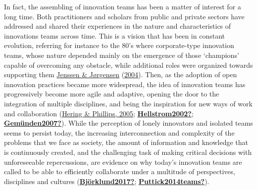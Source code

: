 \documentclass[]{elsarticle} %
\begin{document}
In fact, the assembling of innovation teams has been a matter of
interest for a long time. Both practitioners and scholars from public
and private sectors have addressed and shared their experiences in the
nature and characteristics of innovations teams across time. This is a
vision that has been in constant evolution, referring for instance to
the 80's where corporate-type innovation teams, whose nature depended
mainly on the emergence of those `champions' capable of overcoming any
obstacle, while additional roles were organized towards supporting them
\protect\hyperlink{ref-Jenssen2004}{Jenssen \& Jørgensen}
(\protect\hyperlink{ref-Jenssen2004}{2004}). Then, as the adoption of
open innovation practices became more widespread, the idea of innovation
teams has progressively become more agile and adaptive, opening the door
to the integration of multiple disciplines, and being the inspiration
for new ways of work and collaboration
(\protect\hyperlink{ref-Hering2005}{Hering \& Phillips, 2005};
\protect\hyperlink{ref-Hellstrom2002}{\textbf{Hellstrom2002?}};
\protect\hyperlink{ref-Gemuxfcnden2007}{\textbf{Gemünden2007?}}). While
the perception of lonely innovators and isolated teams seems to persist
today, the increasing interconnection and complexity of the problems
that we face as society, the amount of information and knowledge that is
continuously created, and the challenging task of making critical
decisions with unforeseeable repercussions, are evidence on why today's
innovation teams are called to be able to efficiently collaborate under
a multitude of perspectives, disciplines and cultures
(\protect\hyperlink{ref-Bjuxf6rklund2017}{\textbf{Björklund2017?}};
\protect\hyperlink{ref-Puttick2014teams}{\textbf{Puttick2014teams?}}).
\end{document}
